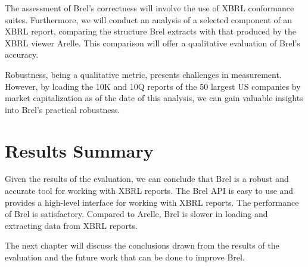 The assessment of Brel's correctness will involve the use of XBRL conformance suites. 
Furthermore, we will conduct an analysis of a selected component of an XBRL report, 
comparing the structure Brel extracts with that produced by the XBRL viewer Arelle. 
This comparison will offer a qualitative evaluation of Brel's accuracy.

Robustness, being a qualitative metric, presents challenges in measurement. 
However, by loading the 10K and 10Q reports of the 50 largest US companies by market capitalization as of the date of this analysis, 
we can gain valuable insights into Brel's practical robustness.









\section{Results Summary}
Given the results of the evaluation, we can conclude that Brel is a robust and accurate tool for working with XBRL reports.
The Brel API is easy to use and provides a high-level interface for working with XBRL reports.
The performance of Brel is satisfactory.
Compared to Arelle, Brel is slower in loading and extracting data from XBRL reports.

The next chapter will discuss the conclusions drawn from the results of the evaluation and the future work that can be done to improve Brel.
